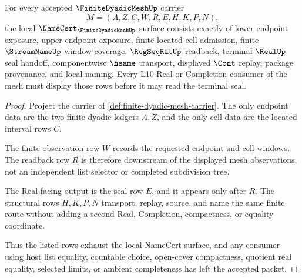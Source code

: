 \begin{theorem}
\label{thm:finite-dyadic-mesh-namecert-obligations}
For every accepted $\FiniteDyadicMeshUp$ carrier
$$
M=(A,Z,C,W,R,E,H,K,P,N),
$$
the local $\NameCert_{\FiniteDyadicMeshUp}$ surface consists exactly of lower endpoint exposure, upper endpoint exposure, finite located-cell admission, finite $\StreamNameUp$ window coverage, $\RegSeqRatUp$ readback, terminal $\RealUp$ seal handoff, componentwise $\hsame$ transport, displayed $\Cont$ replay, package provenance, and local naming. Every L10 Real or Completion consumer of the mesh must display those rows before it may read the terminal seal.
\end{theorem}
\begin{proof}
Project the carrier of \autoref{def:finite-dyadic-mesh-carrier}. The only endpoint data are the two finite dyadic ledgers $A,Z$, and the only cell data are the located interval rows $C$.

The finite observation row $W$ records the requested endpoint and cell windows. The readback row $R$ is therefore downstream of the displayed mesh observations, not an independent list selector or completed subdivision tree.

The Real-facing output is the seal row $E$, and it appears only after $R$. The structural rows $H,K,P,N$ transport, replay, source, and name the same finite route without adding a second Real, Completion, compactness, or equality coordinate.

Thus the listed rows exhaust the local NameCert surface, and any consumer using host list equality, countable choice, open-cover compactness, quotient real equality, selected limits, or ambient completeness has left the accepted packet.
\end{proof}

